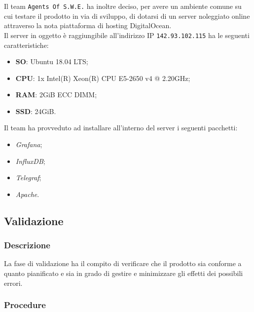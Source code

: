 Il team \texttt{Agents Of S.W.E.} ha inoltre deciso, per avere un ambiente comune su cui testare il prodotto in via di sviluppo, di dotarsi di un server noleggiato online attraverso la nota piattaforma di hosting DigitalOcean\glossario.\\
Il server in oggetto è raggiungibile all'indirizzo IP \texttt{142.93.102.115} ha le seguenti caratteristiche:
\begin{itemize}
	\item \textbf{SO}: Ubuntu 18.04 LTS;
	\item \textbf{CPU}: 1x Intel(R) Xeon(R) CPU E5-2650 v4 @ 2.20GHz;
	\item \textbf{RAM}: 2GiB ECC DIMM;
	\item \textbf{SSD}: 24GiB.
\end{itemize}
Il team ha provveduto ad installare all'interno del server i seguenti pacchetti:
\begin{itemize}
	\item \textit{Grafana};
	\item \textit{InfluxDB};
	\item \textit{Telegraf};
	\item \textit{Apache}\glossario.
\end{itemize}

\subsection{Validazione}\label{validazione}
\subsubsection{Descrizione}
La fase di validazione ha il compito di verificare che il prodotto sia conforme a quanto pianificato e sia in grado di gestire e minimizzare gli effetti dei possibili errori.
\subsubsection{Procedure}
